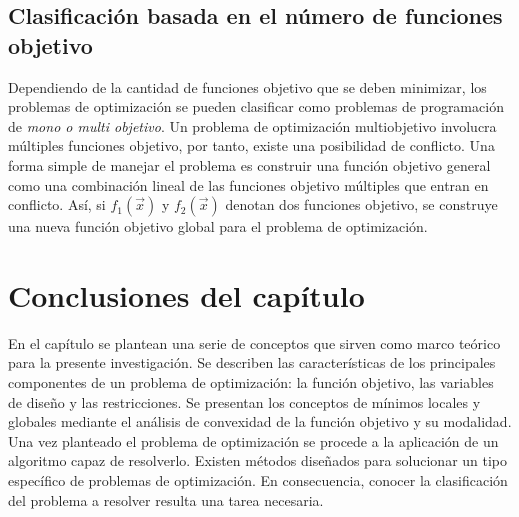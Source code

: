 \subsection{Clasificación basada en el número de funciones objetivo} 
Dependiendo de la cantidad de funciones objetivo que se deben minimizar, los problemas de optimización se pueden clasificar como problemas de programación de \textit{mono o multi objetivo}. Un problema de optimización multiobjetivo involucra múltiples funciones objetivo, por tanto, existe una posibilidad de conflicto. Una forma simple de manejar el problema es construir una función objetivo general como una combinación lineal de las funciones objetivo múltiples que entran en conflicto. Así, si $f_1(\vec{x})$ y $f_2 (\vec{x})$ denotan dos funciones objetivo, se construye una nueva función objetivo global para el problema de optimización.


\section{Conclusiones del capítulo}
En el capítulo se plantean una serie de conceptos que sirven como marco teórico para la presente investigación. Se describen las características de los principales componentes de un problema de optimización: la  función objetivo, las variables de diseño y las restricciones. Se presentan los conceptos de mínimos locales y globales mediante el análisis de convexidad de la función objetivo y su modalidad. Una vez planteado el problema de optimización se procede a la aplicación de un algoritmo capaz de resolverlo. Existen métodos diseñados para solucionar un tipo específico de problemas de optimización. En consecuencia, conocer la clasificación del problema a resolver resulta una tarea necesaria. 
